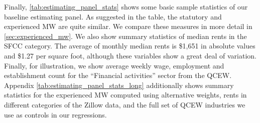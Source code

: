 Finally, \autoref{tab:estimating_panel_stats} shows some basic sample statistics of our 
baseline estimating panel. As suggested in the table, the statutory and experienced MW 
are quite similar. We compare these measures in more detail in \autoref{sec:experienced_mw}.
We also show summary statistics of median rents in the SFCC category. The average of 
monthly median rents is \$1,651 in absolute values and \$1.27 per square foot, although 
these variables show a great deal of variation. Finally, for illustration, we show average 
weekly wage, employment and establishment count for the ``Financial activities'' sector 
from the QCEW. Appendix \autoref{tab:estimating_panel_stats_long} additionally shows 
summary statistics for the experienced MW computed using alternative weights, rents in 
different categories of the Zillow data, and the full set of QCEW industries we use as 
controls in our regressions.

